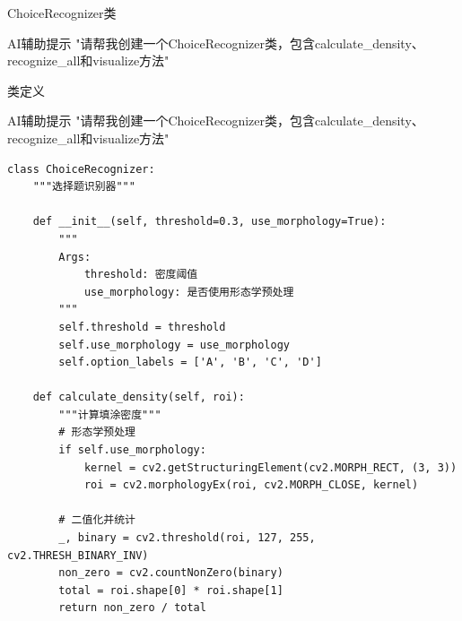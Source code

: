 \begin{frame}[fragile]{ChoiceRecognizer类}
    \begin{block}{AI辅助提示}
        \aihint{} "请帮我创建一个ChoiceRecognizer类，包含calculate_density、recognize_all和visualize方法"
    \end{block}

    \begin{block}{类定义}
    \begin{block}{AI辅助提示}
        \aihint{} "请帮我创建一个ChoiceRecognizer类，包含calculate_density、recognize_all和visualize方法"
    \end{block}

    \begin{lstlisting}[basicstyle=\ttfamily\scriptsize]
class ChoiceRecognizer:
    """选择题识别器"""

    def __init__(self, threshold=0.3, use_morphology=True):
        """
        Args:
            threshold: 密度阈值
            use_morphology: 是否使用形态学预处理
        """
        self.threshold = threshold
        self.use_morphology = use_morphology
        self.option_labels = ['A', 'B', 'C', 'D']

    def calculate_density(self, roi):
        """计算填涂密度"""
        # 形态学预处理
        if self.use_morphology:
            kernel = cv2.getStructuringElement(cv2.MORPH_RECT, (3, 3))
            roi = cv2.morphologyEx(roi, cv2.MORPH_CLOSE, kernel)

        # 二值化并统计
        _, binary = cv2.threshold(roi, 127, 255, cv2.THRESH_BINARY_INV)
        non_zero = cv2.countNonZero(binary)
        total = roi.shape[0] * roi.shape[1]
        return non_zero / total
    \end{lstlisting}
    \end{block}
\end{frame}

